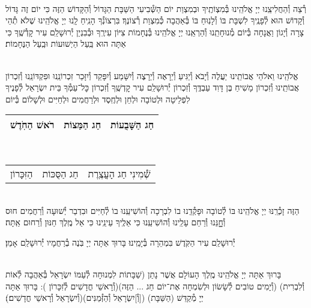 \documentclass[twoside, openany, parskip=half, 11pt]{book}
\begin{document}
\vspace{-.25\baselineskip}
\begin{sometimes}

\shabbos\\
רְ֯צֵה וְ֯הַחֲלִיצֵֽנוּ יְיָ אֱלֹהֵֽינוּ בְּ֯מִצְוֹתֶֽיךָ וּבְמִצְוַת יוֹם הַשְּׁ֯בִיעִי הַשַּׁבָּת הַגָּדוֹל וְ֯הַקָּדוֹשׁ הַזֶּה כִּי יוֹם זֶה גָּדוֹל וְ֯קָדוֹשׁ הוּא לְ֯פָנֶֽיךָ לִשְׁבָּת בּוֹ וְ֯לָנֽוּחַ בּוֹ בְּ֯אַהֲבָה כְּ֯מִצְוַת רְ֯צוֹנֶךָ׃ בִּרְצוֹנְ֯ךָ הָנִֽיחַ לָֽנוּ יְיָ אֱלֹהֵֽינוּ שֶׁלֹא תְ֯הֵי צָרָה וְ֯יָגוֹן וַאֲנָחָה בְּ֯יוֹם מְ֯נוּחָתֵֽנוּ וְ֯הַרְאֵֽנוּ יְיָ אֱלֹהֵֽינוּ בְּ֯נֶחָמוֹת צִיּוֹן עִירֶֽךָ וּבְ֯בִנְיַן יְ֯רוּשָׁלַ‍ִם עִיר קָדְ֯שֶֽׁךָ כִּי אַתָּה הוּא בַּֽעַל הַיְשׁוּעוֹת וּבַֽעַל הַנֶּחָמוֹת׃


\sepline %

\vspace{-.25\baselineskip}
\\
אֱלֹהֵֽינוּ וֵאלֹהֵי אֲבוֹתֵֽינוּ יַעֲלֶה וְ֯יָבֹא וְ֯יַגִּיעַ וְ֯יֵרָאֶה וְ֯יֵרָצֶה וְ֯יִשָּׁמַע וְ֯יִפָּקֵד וְ֯יִזָּכֵר זִכְרוֹנֵֽנוּ וּפִקְדּוֹנֵֽנוּ וְ֯זִכְרוֹן אֲבוֹתֵֽינוּ וְ֯זִכְרוֹן מָשִׁיחַ בֶּן דָּוִד עַבְדֶּֽךָ וְ֯זִכְרוֹן יְ֯רוּשָׁלַ‍ִם עִיר קׇדְשֶֽׁךָ וְ֯זִכְרוֹן כׇּל־עַמְּ֯ךָ בֵּית יִשְׂרָאֵל לְ֯פָנֶיךָ לִפְלֵיטָה וּלְטוֹבָה וּלְחֵן וּלְחֶֽסֶד וּלְרַחֲמִים וּלְחַיִּים וּלְשָׁלוֹם בְּ֯יוֹם\\
\begin{tabular}{c|c|c}
רֹאשׁ הַחֹֽדֶשׁ & חַג הַמַּצוֹת & חַג הַשָּׁבֻעוֹת\\ \hline
\end{tabular}\\
\begin{tabular}{c|c|c}
הַזִּכָּרוֹן & חַג הַסֻּכּוֹת & שְׁ֯מִינִי חַג הָעֲצֶֽרֶת
\end{tabular}\\
הַזֶּה זָכְ֯רֵֽנּוּ יְיָ אֱלֹהֵֽינוּ בּוֹ לְ֯טוֹבָה וּפָקְ֯דֵֽנוּ בוֹ לִבְרָכָה וְ֯הוֹשִׁיעֵֽנוּ בוֹ לְ֯חַיִּים וּבִדְבַר יְ֯שׁוּעָה וְ֯רַחֲמִים חוּס וְ֯חׇׇׇנֵּנוּ וְ֯רַחֵם עָלֵֽינוּ וְ֯הוֹשִׁיעֵֽנוּ כִּי אֵלֶֽיךָ עֵינֵֽינוּ כִּי אֵל מֶֽלֶךְ חַנּוּן וְ֯רַחוּם אַֽתָּה׃

\end{sometimes}

יְ֯רוּשָׁלַ‍ִם עִיר הַקֹּֽדֶשׁ בִּמְהֵרָה בְּ֯יָמֵֽינוּ׃ בָּרוּךְ אַתָּה יְיָ בֹּֽנֶה בְ֯רַחֲמָיו יְ֯רוּשָׁלַ‍ִם אָמֵן׃

\begin{sometimes}

\\
בָּרוּךְ אַתָּה יְיָ אֱלֹהֵֽינוּ מֶֽלֶךְ הָעוֹלָם אֲשֶׁר נָתַן (שַׁבָּתוֹת לִמְנוּחָה לְ֯עַמּוֹ יִשְׂרָאֵל בְּ֯אַהֲבָה לְ֯אוֹת וְ֯לִבְרִית)
(וְ֯יָמִים טוֹבִים לְ֯שָׂשׂוֹן וּלְשִׂמְחָה אֶת־יוֹם חַג ... הַזֶּה)(וְ֯רָאשֵׁי חֳדָשִׁים לְ֯זִכָּרוֹן ):
בָּרוּךְ אַתָּה יְיָ מְ֯קַדֵּשׁ (הַשַּׁבָּת) ([וְ֯]יִשְׂרָאֵל וְ֯הַזְּ֯מַנִּים)(וְ֯יִשְׂרָאֵל וְ֯רָאשֵׁי חֳדָשִׁים׃)׃

\end{sometimes}
\end{document}
